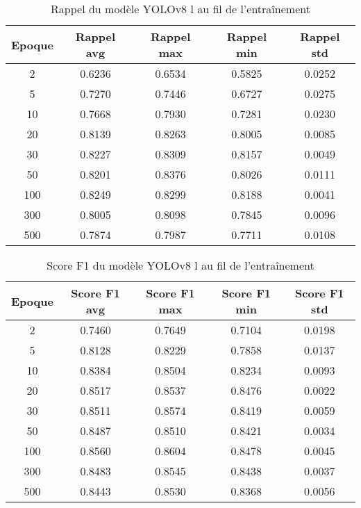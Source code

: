 \begin{table}[!ht]
    \caption{Rappel du modèle YOLOv8 l au fil de l'entraînement}
    \label{tab:yolov8l_rappel}
    \centering
    \begin{tabular}{ |c||c|c|c|c|  }
        \hline
        \rowcolor{gray!50}
        Epoque & Rappel avg & Rappel max & Rappel min & Rappel std\\
        \hline
        2 & 0.6236 & 0.6534 & 0.5825 & 0.0252\\
        5 & 0.7270 & 0.7446 & 0.6727 & 0.0275\\
        10 & 0.7668 & 0.7930 & 0.7281 & 0.0230\\
        20 & 0.8139 & 0.8263 & 0.8005 & 0.0085\\
        30 & 0.8227 & 0.8309 & 0.8157 & 0.0049\\
        50 & 0.8201 & 0.8376 & 0.8026 & 0.0111\\
        100 & 0.8249 & 0.8299 & 0.8188 & 0.0041\\
        300 & 0.8005 & 0.8098 & 0.7845 & 0.0096\\
        500 & 0.7874 & 0.7987 & 0.7711 & 0.0108\\
        \hline
    \end{tabular}
\end{table}

\begin{table}[!ht]
    \caption{Score F1 du modèle YOLOv8 l au fil de l'entraînement}
    \label{tab:yolov8l_f1score}
    \centering
    \begin{tabular}{ |c||c|c|c|c|  }
        \hline
        \rowcolor{gray!50}
        Epoque & Score F1 avg & Score F1 max & Score F1 min & Score F1 std\\
        \hline
        2 & 0.7460 & 0.7649 & 0.7104 & 0.0198\\
        5 & 0.8128 & 0.8229 & 0.7858 & 0.0137\\
        10 & 0.8384 & 0.8504 & 0.8234 & 0.0093\\
        20 & 0.8517 & 0.8537 & 0.8476 & 0.0022\\
        30 & 0.8511 & 0.8574 & 0.8419 & 0.0059\\
        50 & 0.8487 & 0.8510 & 0.8421 & 0.0034\\
        100 & 0.8560 & 0.8604 & 0.8478 & 0.0045\\
        300 & 0.8483 & 0.8545 & 0.8438 & 0.0037\\
        500 & 0.8443 & 0.8530 & 0.8368 & 0.0056\\
        \hline
    \end{tabular}
\end{table}

